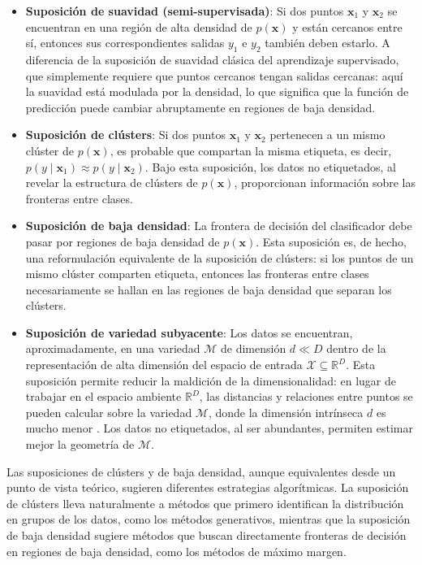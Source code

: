 \begin{itemize}
    \item \textbf{Suposición de suavidad (semi-supervisada)}: Si dos puntos $\mathbf{x}_1$ y $\mathbf{x}_2$ se encuentran en una región de alta densidad de $p(\mathbf{x})$ y están cercanos entre sí, entonces sus correspondientes salidas $y_1$ e $y_2$ también deben estarlo. A diferencia de la suposición de suavidad clásica del aprendizaje supervisado, que simplemente requiere que puntos cercanos tengan salidas cercanas: aquí la suavidad está modulada por la densidad, lo que significa que la función de predicción puede cambiar abruptamente en regiones de baja densidad.
    
    \item \textbf{Suposición de clústers}: Si dos puntos $\mathbf{x}_1$ y $\mathbf{x}_2$ pertenecen a un mismo clúster de $p(\mathbf{x})$, es probable que compartan la misma etiqueta, es decir, $p(y \mid \mathbf{x}_1) \approx p(y \mid \mathbf{x}_2)$. Bajo esta suposición, los datos no etiquetados, al revelar la estructura de clústers de $p(\mathbf{x})$, proporcionan información sobre las fronteras entre clases.
    
    \item \textbf{Suposición de baja densidad}: La frontera de decisión del clasificador debe pasar por regiones de baja densidad de $p(\mathbf{x})$. Esta suposición es, de hecho, una reformulación equivalente de la suposición de clústers: si los puntos de un mismo clúster comparten etiqueta, entonces las fronteras entre clases necesariamente se hallan en las regiones de baja densidad que separan los clústers.
    
    \item \textbf{Suposición de variedad subyacente}: Los datos se encuentran, aproximadamente, en una variedad $\mathcal{M}$ de dimensión $d \ll D$ dentro de la representación de alta dimensión del espacio de entrada $\mathcal{X} \subseteq \mathbb{R}^D$. Esta suposición permite reducir la maldición de la dimensionalidad: en lugar de trabajar en el espacio ambiente $\mathbb{R}^D$, las distancias y relaciones entre puntos se pueden calcular sobre la variedad $\mathcal{M}$, donde la dimensión intrínseca $d$ es mucho menor \cite{10.7551/mitpress/9780262033589.001.0001}. Los datos no etiquetados, al ser abundantes, permiten estimar mejor la geometría de $\mathcal{M}$.
\end{itemize}

\begin{rema}
Las suposiciones de clústers y de baja densidad, aunque equivalentes desde un punto de vista teórico, sugieren diferentes estrategias algorítmicas. La suposición de clústers lleva naturalmente a métodos que primero identifican la distribución en grupos de los datos, como los métodos generativos, mientras que la suposición de baja densidad sugiere métodos que buscan directamente fronteras de decisión en regiones de baja densidad, como los métodos de máximo margen.
\end{rema}

